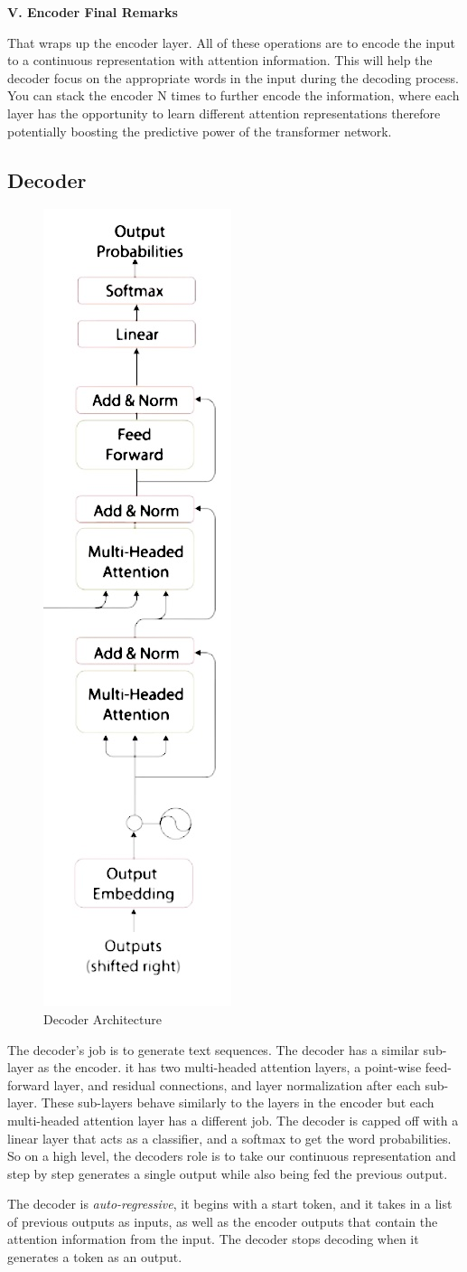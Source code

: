 \noindent
\textbf{V. Encoder Final Remarks}

That wraps up the encoder layer. All of these operations are to encode the input to a continuous representation with attention information. This will help the decoder focus on the appropriate words in the input during the decoding process. You can stack the encoder N times to further encode the information, where each layer has the opportunity to learn different attention representations therefore potentially boosting the predictive power of the transformer network.

\subsection{Decoder}

\begin{figure}[H]
\centering
\includegraphics[width=.14\textwidth]{figures/t11.jpg}
\caption{Decoder Architecture}
\end{figure}

The decoder’s job is to generate text sequences. The decoder has a similar sub-layer as the encoder. it has two multi-headed attention layers, a point-wise feed-forward layer, and residual connections, and layer normalization after each sub-layer. These sub-layers behave similarly to the layers in the encoder but each multi-headed attention layer has a different job. The decoder is capped off with a linear layer that acts as a classifier, and a softmax to get the word probabilities. So on a high level, the decoders role is to take our continuous representation and step by step generates a single output while also being fed the previous output.

The decoder is \emph{auto-regressive}, it begins with a start token, and it takes in a list of previous outputs as inputs, as well as the encoder outputs that contain the attention information from the input. The decoder stops decoding when it generates a token as an output. \\

